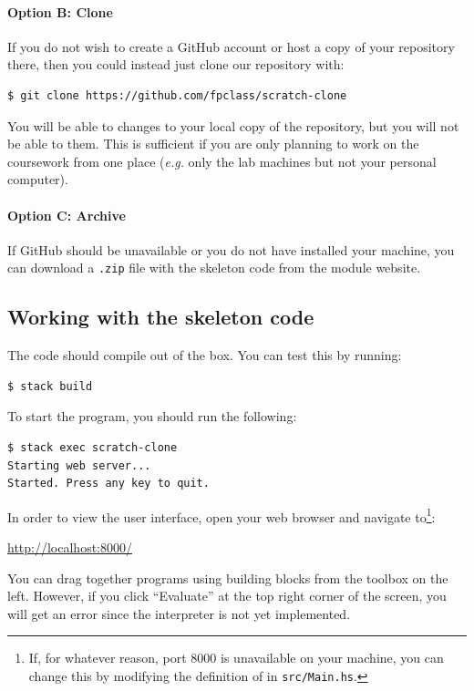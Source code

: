 \paragraph{Option B: Clone} If you do not wish to create a GitHub account or host a copy of your repository there, then you could instead just clone our repository with:
\begin{verbatim}
$ git clone https://github.com/fpclass/scratch-clone
\end{verbatim}
You will be able to  changes to your local copy of the repository, but you will not be able to  them. This is sufficient if you are only planning to work on the coursework from one place (\emph{e.g.} only the lab machines but not your personal computer).

\paragraph{Option C: Archive} If GitHub should be unavailable or you do not have  installed your machine, you can download a \texttt{\small .zip} file with the skeleton code from the module website.

\subsection{Working with the skeleton code}

The code should compile out of the box. You can test this by running:
\begin{verbatim}
$ stack build
\end{verbatim}
To start the program, you should run the following:
\begin{verbatim}
$ stack exec scratch-clone
Starting web server...
Started. Press any key to quit.
\end{verbatim}
In order to view the user interface, open your web browser and navigate to\footnote{If, for whatever reason, port 8000 is unavailable on your machine, you can change this by modifying the definition of  in \texttt{\small src/Main.hs}.}:
\begin{center}
\url{http://localhost:8000/}
\end{center}
You can drag together programs using building blocks from the toolbox on the left. However, if you click ``Evaluate'' at the top right corner of the screen, you will get an error since the interpreter is not yet implemented.

